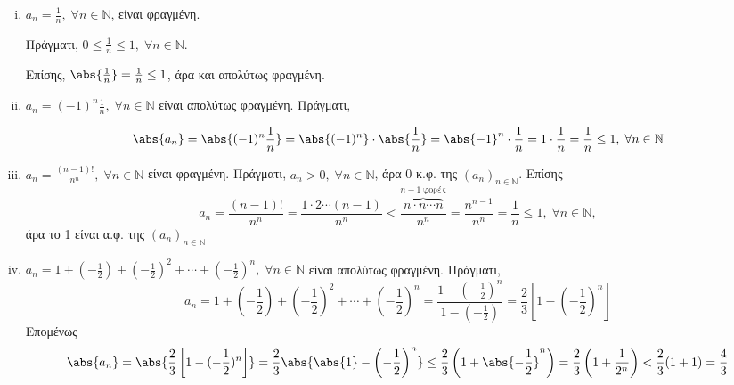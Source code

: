 \documentclass[main.tex]{subfiles}
\begin{document}
\begin{examples}
\item {}  
    \begin{enumerate}[i)]
        \item $ a_{n}= \frac{1}{n}, \; \forall n \in \mathbb{N} $, είναι 
            φραγμένη.

            Πράγματι, $ 0 \leq \frac{1}{n} \leq 1, \; \forall n \in 
            \mathbb{N} $. 

            Επίσης, $ \abs{\frac{1}{n}} = \frac{1}{n} \leq 1 $, άρα και 
            απολύτως φραγμένη.
        \item $ a_{n}=(-1)^{n} \frac{1}{n}, \; \forall n \in \mathbb{N} $ 
            είναι απολύτως φραγμένη. Πράγματι,

            \[
                \abs{a_{n}} = \abs{(-1)^{n} \frac{1}{n}} = \abs{(-1)^{n}} 
                \cdot \abs{\frac{1}{n}} = \abs{-1}^{n} \cdot \frac{1}{n}
                = 1 \cdot \frac{1}{n} = \frac{1}{n} \leq 1, \; \forall n \in 
                \mathbb{N}
            \] 

        \item $ a_{n}= \frac{(n-1)!}{n^{n}}, \; \forall n \in \mathbb{N} $
            είναι φραγμένη. Πράγματι, $ a_{n} > 0, \; \forall n \in 
            \mathbb{N}$, άρα 0 κ.φ. της $( a_{n})_{n \in \mathbb{N}} $. 
            Επίσης 
            \[
                a_{n}= \frac{(n-1)!}{n^{n}} = \frac{1 \cdot 2 \cdots
                    (n-1)}{n^{n}} < \frac{\overbrace{n \cdot n \cdots n}
                ^{n-1 \; \text{φορές}}}{n^{n}} = \frac{n^{n-1}}{n^{n}} =
                \frac{1}{n} \leq 1, \; \forall n \in \mathbb{N},
            \] άρα το 1 είναι α.φ. της $ (a_{n})_{n \in \mathbb{N}} $ 

        \item $ a_{n}= 1 + \left(- \frac{1}{2} \right) + \left(- 
                \frac{1}{2}\right)^{2} + \cdots + \left(-\frac{1}{2} 
            \right) ^{n}, 
            \; \forall n \in \mathbb{N} $ είναι απολύτως φραγμένη. Πράγματι, 
            \[ a_{n} = 1 + \left(- \frac{1}{2}\right) + \left(- \frac{1}{2} 
                \right)^{2} + \cdots + \left(- \frac{1}{2} \right)^{n} = 
                \frac{1 - (- \frac{1}{2} )^{n}}{1 - (- \frac{1}{2})} = 
            \frac{2}{3} \left[1 - \left(- \frac{1}{2} \right)^{n}\right] \]
            Επομένως
            \[
                \abs{a_{n}} = \abs{\frac{2}{3} \left[1-(- \frac{1}{2} )^{n}
                        \right]} = \frac{2}{3} \abs{\abs{1} - \left(- 
                \frac{1}{2}\right)^{n}} \leq 
                \frac{2}{3} \left(1 + \abs{-\frac{1}{2} }^{n} \right) = 
                \frac{2}{3} \left(1+ \frac{1}{2^{n}}\right) < \frac{2}{3}
                (1+1) = \frac{4}{3} 
            \] 


\end{enumerate}
\end{examples}
\end{document}
